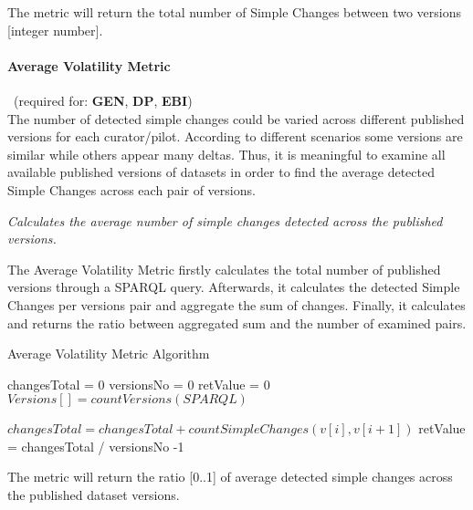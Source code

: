The metric will return the total number of Simple Changes between two versions [integer number].


\paragraph{Average Volatility Metric}~(required for: \textbf{GEN}, \textbf{DP}, \textbf{EBI})~\\ %
The number of detected simple changes could be varied across different published versions for each curator/pilot. According to different scenarios some versions are similar while others appear many deltas. Thus, it is meaningful to examine all available published versions of datasets in order to find the average detected Simple Changes across each pair of versions. 

\begin{mdframed}[style=metricdefinition]
\emph{Calculates the average number of simple changes detected across the published versions.}
\end{mdframed}

The Average Volatility Metric firstly calculates the total number of published versions through a SPARQL query. Afterwards, it calculates the detected Simple Changes per versions pair and aggregate the sum of changes. Finally, it calculates and returns the ratio between aggregated sum and the number of examined pairs.

\begin{algorithm}
\caption{Average Volatility Metric Algorithm}
\begin{algorithmic}[1]

\State changesTotal = 0
\State versionsNo = 0
\State retValue = 0
\EndProcedure
{}
\State $ Versions [] = countVersions (SPARQL)$

\State $changesTotal = changesTotal + countSimpleChanges(v[i],v[i+1])$
\EndFor
\EndProcedure
\State retValue = changesTotal / versionsNo -1
\State {}
\end{algorithmic}
\end{algorithm}

The metric will return the ratio [0..1] of average detected simple changes across the published dataset versions. 

